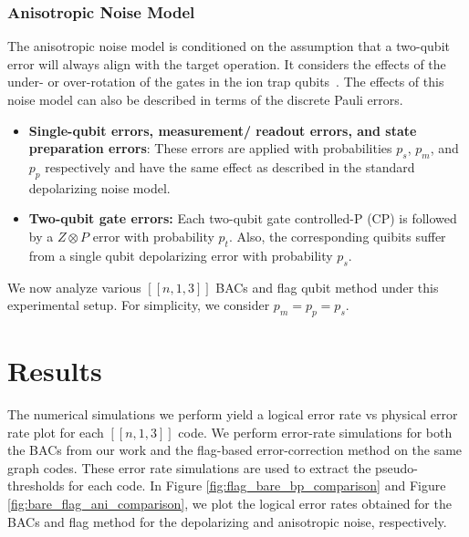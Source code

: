 \documentclass[reprint, amsmath,amssymb, aps,pra,
 floatfix,
]{revtex4-2}
\begin{document}
\subsubsection{Anisotropic Noise Model}
\noindent The anisotropic noise model is conditioned on the assumption that a two-qubit error will always align with the target operation.
It considers the effects of the under- or over-rotation of the gates in the ion trap qubits~\cite{parrado2020crosstalk,PhysRevLett.82.1971}.
The effects of this noise model can also be described in terms of the discrete Pauli errors.
\begin{itemize}
    \item \textbf{Single-qubit errors, measurement/ readout errors, and state preparation errors}: These errors are applied with probabilities $p_s$, $p_{m}$, and $p_{p}$ respectively and have the same effect as described in the standard depolarizing noise model.
    \item \textbf{Two-qubit gate errors:} 
    Each two-qubit gate controlled-P (CP) is followed by a $Z \otimes P$ error with probability $p_t$.
    Also, the corresponding quibits suffer from a single qubit depolarizing error with probability $p_s$. 
    \end{itemize}
\noindent We now analyze various $[[n,1,3]]$ BACs and flag qubit method under this experimental setup.
For simplicity, we consider $p_m = p_p = p_s$.
\section{Results}
\label{sec:results analysis}
\noindent The numerical simulations we perform yield a logical error rate vs physical error rate plot for each $[[n,1,3]]$ code.
We perform error-rate simulations for both the BACs from our work and the flag-based error-correction method on the same graph codes.
These error rate simulations are used to extract the pseudo-thresholds for each code.
In Figure \ref{fig:flag_bare_bp_comparison} and Figure \ref{fig:bare_flag_ani_comparison}, we plot the logical error rates obtained for the BACs and flag method for the depolarizing and anisotropic noise, respectively.
\end{document}
